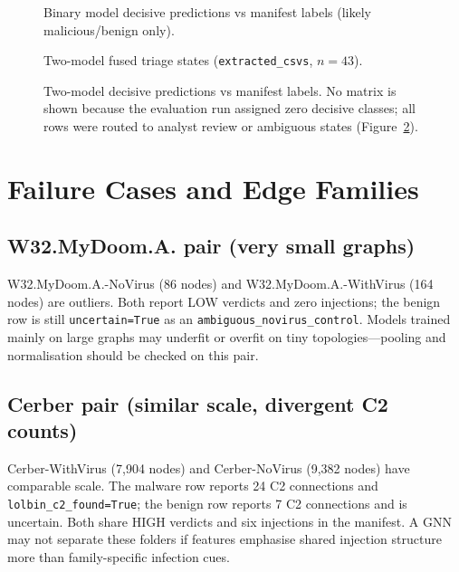 \begin{figure}[htbp]
\centering
\vspace{0.25cm}

\vspace{0.35cm}
\caption{Binary model decisive predictions vs manifest labels (likely malicious/benign only).}
\label{fig:binary_confusion}
\end{figure}

\begin{figure}[htbp]
\centering

\caption{Two-model fused triage states (\texttt{extracted\_csvs}, $n{=}43$).}
\label{fig:two_model_triage}
\end{figure}

\begin{figure}[htbp]
\centering

\caption{Two-model decisive predictions vs manifest labels. No matrix is shown because the evaluation run assigned zero decisive classes; all rows were routed to analyst review or ambiguous states (Figure~\ref{fig:two_model_triage}).}
\label{fig:two_model_confusion}
\end{figure}

\section{Failure Cases and Edge Families}
\label{sec:failure_cases}

\subsection{W32.MyDoom.A. pair (very small graphs)}

W32.MyDoom.A.-NoVirus (86 nodes) and W32.MyDoom.A.-WithVirus (164 nodes) are outliers. Both report LOW verdicts and zero injections; the benign row is still \texttt{uncertain=True} as an \texttt{ambiguous\_novirus\_control}. Models trained mainly on large graphs may underfit or overfit on tiny topologies---pooling and normalisation should be checked on this pair.

\subsection{Cerber pair (similar scale, divergent C2 counts)}

Cerber-WithVirus (7,904 nodes) and Cerber-NoVirus (9,382 nodes) have comparable scale. The malware row reports 24 C2 connections and \texttt{lolbin\_c2\_found=True}; the benign row reports 7 C2 connections and is uncertain. Both share HIGH verdicts and six injections in the manifest. A GNN may not separate these folders if features emphasise shared injection structure more than family-specific infection cues.

